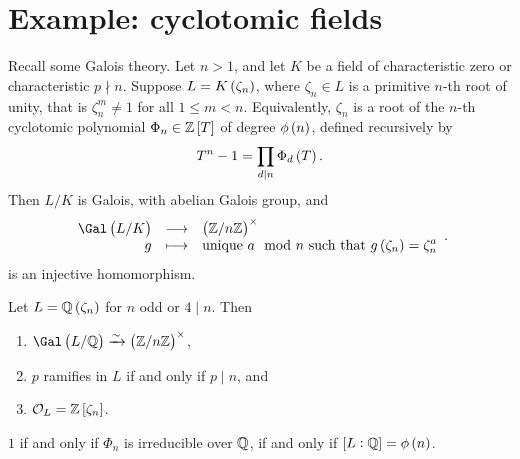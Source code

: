 \pagebreak

\section{Example: cyclotomic fields}

Recall some Galois theory. Let $ n > 1 $, and let $ K $ be a field of characteristic zero or characteristic $ p \nmid n $. Suppose $ L = K\br{\zeta_n} $, where $ \zeta_n \in L $ is a primitive $ n $-th root of unity, that is $ \zeta_n^m \ne 1 $ for all $ 1 \le m < n $. Equivalently, $ \zeta_n $ is a root of the $ n $-th cyclotomic polynomial $ \Phi_n \in \ZZ\sbr{T} $ of degree $ \phi\br{n} $, defined recursively by
$$ T^n - 1 = \prod_{d \mid n} \Phi_d\br{T}. $$
Then $ L / K $ is Galois, with abelian Galois group, and
$$ \function{\Gal\br{L / K}}{\br{\ZZ / n\ZZ}^\times}{g}{\text{unique} \ a \mod n \ \text{such that} \ g\br{\zeta_n} = \zeta_n^a}. $$
is an injective homomorphism.

\begin{theorem}
\label{thm:5.1}
Let $ L = \QQ\br{\zeta_n} $ for $ n $ odd or $ 4 \mid n $. Then
\begin{enumerate}
\item $ \Gal\br{L / \QQ} \xrightarrow{\sim} \br{\ZZ / n\ZZ}^\times $,
\item $ p $ ramifies in $ L $ if and only if $ p \mid n $, and
\item $ \OOO_L = \ZZ\sbr{\zeta_n} $.
\end{enumerate}
\end{theorem}

\begin{remark*}
$ 1 $ if and only if $ \Phi_n $ is irreducible over $ \mathbb{Q} $, if and only if $ \sbr{L : \QQ} = \phi\br{n} $.
\end{remark*}

